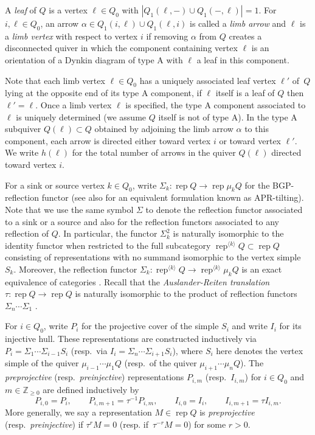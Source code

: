 \documentclass{amsart}
\newtheorem{lemma}[theorem]{Lemma}
\numberwithin{equation}{section}
\newcommand{\ZZ}{\mathbb{Z}}
\newcommand{\Hom}{\operatorname{Hom}}
\newcommand{\Irr}{\operatorname{Irr}}
\newcommand{\rep}{\operatorname{rep}}
\begin{document}
A \emph{leaf} of $Q$ is a vertex $\ell\in Q_0$ with $|Q_1(\ell,-)\cup Q_1(-,\ell)|=1$.
For $i,\ell\in Q_0$, an arrow $\alpha\in Q_1(i,\ell)\cup Q_1(\ell,i)$ is called a \emph{limb arrow} and $\ell$ is a \emph{limb vertex} with respect to vertex $i$ if removing $\alpha$ from $Q$ creates a disconnected quiver in which the component containing vertex $\ell$ is an orientation of a Dynkin diagram of type A with $\ell$ a leaf in this component.

Note that each limb vertex $\ell\in Q_0$ has a uniquely associated leaf vertex $\ell'$ of~$Q$ lying at the opposite end of its type A component, if $\ell$ itself is a leaf of $Q$ then $\ell'=\ell$.
Once a limb vertex $\ell$ is specified, the type A component associated to $\ell$ is uniquely determined (we assume $Q$ itself is not of type A).
In the type A subquiver $Q(\ell)\subset Q$ obtained by adjoining the limb arrow $\alpha$ to this component, each arrow is directed either toward vertex $i$ or toward vertex $\ell'$.
We write $h(\ell)$ for the total number of arrows in the quiver $Q(\ell)$ directed toward vertex $i$.

For a sink or source vertex $k\in Q_0$, write $\Sigma_k:\rep Q\to\rep \mu_k Q$ for the BGP-reflection functor \cite{BGP??} (see also \cite{APR??} for an equivalent formulation known as APR-tilting).
Note that we use the same symbol $\Sigma$ to denote the reflection functor associated to a sink or a source and also for the reflection functors associated to any reflection of $Q$.
In particular, the functor $\Sigma_k^2$ is naturally isomorphic to the identity functor when restricted to the full subcategory $\rep^{\langle k\rangle} Q\subset\rep Q$ consisting of representations with no summand isomorphic to the vertex simple $S_k$.
Moreover, the reflection functor $\Sigma_k:\rep^{\langle k\rangle} Q\to\rep^{\langle k\rangle} \mu_k Q$ is an exact equivalence of categories \cite{DR76}.
Recall that the \emph{Auslander-Reiten translation} $\tau:\rep Q\to\rep Q$ is naturally isomorphic to the product of reflection functors $\Sigma_n\cdots\Sigma_1$ \cite{BB??}.

For $i\in Q_0$, write $P_i$ for the projective cover of the simple $S_i$ and write $I_i$ for its injective hull.
These representations are constructed inductively via $P_i=\Sigma_1\cdots\Sigma_{i-1}S_i$ (resp.~via $I_i=\Sigma_n\cdots\Sigma_{i+1}S_i$), where $S_i$ here denotes the vertex simple of the quiver $\mu_{i-1}\cdots\mu_1 Q$ (resp.~of the quiver $\mu_{i+1}\cdots\mu_n Q$).
The \emph{preprojective} (resp.~\emph{preinjective}) representations $P_{i,m}$ (resp.~$I_{i,m}$) for $i\in Q_0$ and $m\in\ZZ_{\ge0}$ are defined inductively by
\[P_{i,0}=P_i,\qquad P_{i,m+1}=\tau^{-1} P_{i,m},\qquad I_{i,0}=I_i,\qquad I_{i,m+1}=\tau I_{i,m}.\]
More generally, we say a representation $M\in\rep Q$ is \emph{preprojective} (resp.~\emph{preinjective}) if $\tau^r M=0$ (resp. if~$\tau^{-r} M=0$) for some $r>0$.
\end{document}
